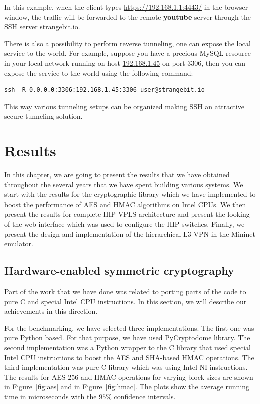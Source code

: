 In this example, when the client types \url{https://192.168.1.1:4443/} in the browser window,
the traffic will be forwarded to the remote {\bf youtube} server through the SSH server \url{strangebit.io}.

There is also a possibility to perform reverse tunneling, \ie one can expose the local service to the world.
For example, suppose you have a precious MySQL resource in your local network running on host \url{192.168.1.45} 
on port $3306$, then you can expose the service to the world using the following command:

\begin{verbatim}
ssh -R 0.0.0.0:3306:192.168.1.45:3306 user@strangebit.io
\end{verbatim}

This way various tunneling setups can be organized making SSH an attractive secure tunneling 
solution.

\chapter{Results}

In this chapter, we are going to present the results that we have obtained 
throughout the several years that we have spent building various systems. We start 
with the results for the cryptographic library which we have implemented to 
boost the performance of AES and HMAC algorithms on Intel CPUs. We then 
present the results for complete HIP-VPLS architecture and present the 
looking of the web interface which was used to configure the HIP switches.
Finally, we present the design and implementation of the hierarchical L3-VPN
in the Mininet emulator.  

\section{Hardware-enabled symmetric cryptography}

Part of the work that we have done was related to porting parts of the code to pure C 
and special Intel CPU instructions. In this section, we will describe our achievements 
in this direction. 

For the benchmarking, we have selected three implementations. The first one was pure 
Python based. For that purpose, we have used PyCryptodome library. The second implementation
was a Python wrapper to the C library that used special Intel CPU instructions to boost 
the AES and SHA-based HMAC operations. The third implementation was pure C library 
which was using Intel NI instructions. The results for AES-256 and HMAC operations 
for varying block sizes are shown in Figure~\ref{fig:aes} 
and in Figure~\ref{fig:hmac}. The plots show the average 
running time in microseconds with the $95\%$ confidence intervals. 

